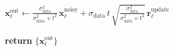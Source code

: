 \begin{algorithm}
\begin{algorithmic}[1]
\State
$\mathbf{x}^{\text{out}}_{\ell}
\gets
\frac{\sigma_{\text{data}}^{2}}{\sigma_{\text{data}}^{2}+t^{2}}\,
\mathbf{x}^{\text{noisy}}_{\ell}
+
\sigma_{\text{data}}\, t\,
\sqrt{\frac{\sigma_{\text{data}}^{2}}{\sigma_{\text{data}}^{2}+t^{2}}}\,
\mathbf{r}^{\text{update}}_{\ell}$

\State \textbf{return} $\{\mathbf{x}^{\text{out}}_{\ell}\}$

\end{algorithmic}
\end{algorithm}
